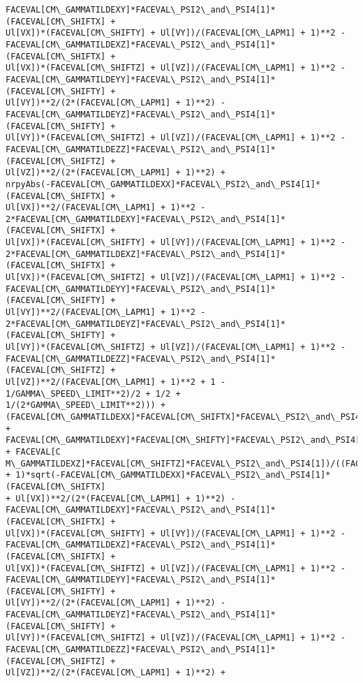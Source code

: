 \documentclass[landscape,letterpaper,10pt,english]{article}
\begin{document}
\begin{Verbatim}[commandchars=\\\{\}]
FACEVAL[CM\_GAMMATILDEXY]*FACEVAL\_PSI2\_and\_PSI4[1]*(FACEVAL[CM\_SHIFTX] +
Ul[VX])*(FACEVAL[CM\_SHIFTY] + Ul[VY])/(FACEVAL[CM\_LAPM1] + 1)**2 -
FACEVAL[CM\_GAMMATILDEXZ]*FACEVAL\_PSI2\_and\_PSI4[1]*(FACEVAL[CM\_SHIFTX] +
Ul[VX])*(FACEVAL[CM\_SHIFTZ] + Ul[VZ])/(FACEVAL[CM\_LAPM1] + 1)**2 -
FACEVAL[CM\_GAMMATILDEYY]*FACEVAL\_PSI2\_and\_PSI4[1]*(FACEVAL[CM\_SHIFTY] +
Ul[VY])**2/(2*(FACEVAL[CM\_LAPM1] + 1)**2) -
FACEVAL[CM\_GAMMATILDEYZ]*FACEVAL\_PSI2\_and\_PSI4[1]*(FACEVAL[CM\_SHIFTY] +
Ul[VY])*(FACEVAL[CM\_SHIFTZ] + Ul[VZ])/(FACEVAL[CM\_LAPM1] + 1)**2 -
FACEVAL[CM\_GAMMATILDEZZ]*FACEVAL\_PSI2\_and\_PSI4[1]*(FACEVAL[CM\_SHIFTZ] +
Ul[VZ])**2/(2*(FACEVAL[CM\_LAPM1] + 1)**2) +
nrpyAbs(-FACEVAL[CM\_GAMMATILDEXX]*FACEVAL\_PSI2\_and\_PSI4[1]*(FACEVAL[CM\_SHIFTX] +
Ul[VX])**2/(FACEVAL[CM\_LAPM1] + 1)**2 -
2*FACEVAL[CM\_GAMMATILDEXY]*FACEVAL\_PSI2\_and\_PSI4[1]*(FACEVAL[CM\_SHIFTX] +
Ul[VX])*(FACEVAL[CM\_SHIFTY] + Ul[VY])/(FACEVAL[CM\_LAPM1] + 1)**2 -
2*FACEVAL[CM\_GAMMATILDEXZ]*FACEVAL\_PSI2\_and\_PSI4[1]*(FACEVAL[CM\_SHIFTX] +
Ul[VX])*(FACEVAL[CM\_SHIFTZ] + Ul[VZ])/(FACEVAL[CM\_LAPM1] + 1)**2 -
FACEVAL[CM\_GAMMATILDEYY]*FACEVAL\_PSI2\_and\_PSI4[1]*(FACEVAL[CM\_SHIFTY] +
Ul[VY])**2/(FACEVAL[CM\_LAPM1] + 1)**2 -
2*FACEVAL[CM\_GAMMATILDEYZ]*FACEVAL\_PSI2\_and\_PSI4[1]*(FACEVAL[CM\_SHIFTY] +
Ul[VY])*(FACEVAL[CM\_SHIFTZ] + Ul[VZ])/(FACEVAL[CM\_LAPM1] + 1)**2 -
FACEVAL[CM\_GAMMATILDEZZ]*FACEVAL\_PSI2\_and\_PSI4[1]*(FACEVAL[CM\_SHIFTZ] +
Ul[VZ])**2/(FACEVAL[CM\_LAPM1] + 1)**2 + 1 - 1/GAMMA\_SPEED\_LIMIT**2)/2 + 1/2 +
1/(2*GAMMA\_SPEED\_LIMIT**2))) +
(FACEVAL[CM\_GAMMATILDEXX]*FACEVAL[CM\_SHIFTX]*FACEVAL\_PSI2\_and\_PSI4[1] +
FACEVAL[CM\_GAMMATILDEXY]*FACEVAL[CM\_SHIFTY]*FACEVAL\_PSI2\_and\_PSI4[1] + FACEVAL[C
M\_GAMMATILDEXZ]*FACEVAL[CM\_SHIFTZ]*FACEVAL\_PSI2\_and\_PSI4[1])/((FACEVAL[CM\_LAPM1]
+ 1)*sqrt(-FACEVAL[CM\_GAMMATILDEXX]*FACEVAL\_PSI2\_and\_PSI4[1]*(FACEVAL[CM\_SHIFTX]
+ Ul[VX])**2/(2*(FACEVAL[CM\_LAPM1] + 1)**2) -
FACEVAL[CM\_GAMMATILDEXY]*FACEVAL\_PSI2\_and\_PSI4[1]*(FACEVAL[CM\_SHIFTX] +
Ul[VX])*(FACEVAL[CM\_SHIFTY] + Ul[VY])/(FACEVAL[CM\_LAPM1] + 1)**2 -
FACEVAL[CM\_GAMMATILDEXZ]*FACEVAL\_PSI2\_and\_PSI4[1]*(FACEVAL[CM\_SHIFTX] +
Ul[VX])*(FACEVAL[CM\_SHIFTZ] + Ul[VZ])/(FACEVAL[CM\_LAPM1] + 1)**2 -
FACEVAL[CM\_GAMMATILDEYY]*FACEVAL\_PSI2\_and\_PSI4[1]*(FACEVAL[CM\_SHIFTY] +
Ul[VY])**2/(2*(FACEVAL[CM\_LAPM1] + 1)**2) -
FACEVAL[CM\_GAMMATILDEYZ]*FACEVAL\_PSI2\_and\_PSI4[1]*(FACEVAL[CM\_SHIFTY] +
Ul[VY])*(FACEVAL[CM\_SHIFTZ] + Ul[VZ])/(FACEVAL[CM\_LAPM1] + 1)**2 -
FACEVAL[CM\_GAMMATILDEZZ]*FACEVAL\_PSI2\_and\_PSI4[1]*(FACEVAL[CM\_SHIFTZ] +
Ul[VZ])**2/(2*(FACEVAL[CM\_LAPM1] + 1)**2) +

\end{Verbatim}
\end{document}
